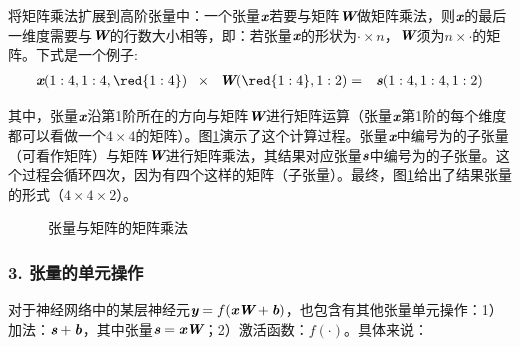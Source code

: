 \parinterval 将矩阵乘法扩展到高阶张量中：一个张量${\textbf{\em x}}$若要与矩阵$ {\textbf{\em W}}$做矩阵乘法，则$ {\textbf{\em x}} $的最后一维度需要与${\textbf{\em W}}$的行数大小相等，即：若张量${\textbf{\em x}} $的形状为$ \cdot \times n $，${\textbf{\em W}} $须为$ n\times \cdot $的矩阵。下式是一个例子:
\begin{eqnarray}
{\mathbi{x}}(1:4,1:4,{\red{1:4}})\;\;\times\;\; {{\mathbi{W}}({\red{1:4}},1:2)}&=&{\mathbi{s}}(1:4,1:4,1:2)
\label{eq:9-25}
\end{eqnarray}

\noindent 其中，张量${\textbf{\em x}} $沿第1阶所在的方向与矩阵$ {\textbf{\em W}}$进行矩阵运算（张量${\textbf{\em x}}$第1阶的每个维度都可以看做一个$ 4\times 4 $的矩阵）。图\ref{fig:9-27}演示了这个计算过程。张量${\textbf{\em x}}$中编号为的子张量（可看作矩阵）与矩阵${\textbf{\em W}}$进行矩阵乘法，其结果对应张量$ {\textbf{\em s}}$中编号为的子张量。这个过程会循环四次，因为有四个这样的矩阵（子张量）。最终，图\ref{fig:9-27}给出了结果张量的形式（$ 4 \times 4 \times 2 $）。

\begin{figure}[htp]
\centering

\caption{张量与矩阵的矩阵乘法}
\label{fig:9-27}
\end {figure}

\subsubsection{3. 张量的单元操作}
\vspace{0.5em}

\parinterval 对于神经网络中的某层神经元$ {\textbf{\em y}}=f({\textbf{\em x}} {\textbf{\em W}}+{\textbf{\em b}}) $，也包含有其他张量单元操作：1）加法：$ {\textbf{\em s}}+{\textbf{\em b}}$，其中张量$ {\textbf{\em s}}={\textbf{\em x}}{\textbf{\em W}} $；2）激活函数：$ f(\cdot) $。具体来说：

